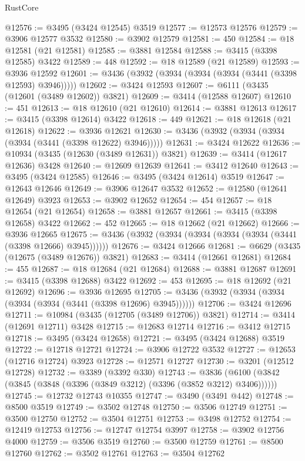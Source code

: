 \begin{lexlean}{RustCore}
\begin{coremodule}
@12576 := @3495 (@3424 @12545) @3519
@12577 := @12573 @12576
@12579 := @3906 @12577 @3532
@12580 := @3902 @12579
@12581 := 450
@12584 := @18 @12581 (@21 @12581)
@12585 := @3881 @12584
@12588 := @3415 (@3398 @12585) @3422
@12589 := 448
@12592 := @18 @12589 (@21 @12589)
@12593 := @3936 @12592
@12601 := @3436 (@3932 (@3934 (@3934 (@3934 (@3441 (@3398 @12593) @3946)))))
@12602 := @3424 @12593
@12607 := @6111 (@3435 (@12601 (@3489 @12602)) @3821)
@12609 := @3414 (@12588 @12607)
@12610 := 451
@12613 := @18 @12610 (@21 @12610)
@12614 := @3881 @12613
@12617 := @3415 (@3398 @12614) @3422
@12618 := 449
@12621 := @18 @12618 (@21 @12618)
@12622 := @3936 @12621
@12630 := @3436 (@3932 (@3934 (@3934 (@3934 (@3441 (@3398 @12622) @3946)))))
@12631 := @3424 @12622
@12636 := @10934 (@3435 (@12630 (@3489 @12631)) @3821)
@12639 := @3414 (@12617 @12636) @3428
@12640 := @12609 @12639
@12641 := @3412 @12640
@12643 := @3495 (@3424 @12585)
@12646 := @3495 (@3424 @12614) @3519
@12647 := @12643 @12646
@12649 := @3906 @12647 @3532
@12652 := @12580 (@12641 @12649) @3923
@12653 := @3902 @12652
@12654 := 454
@12657 := @18 @12654 (@21 @12654)
@12658 := @3881 @12657
@12661 := @3415 (@3398 @12658) @3422
@12662 := 452
@12665 := @18 @12662 (@21 @12662)
@12666 := @3936 @12665
@12675 := @3436 (@3932 (@3934 (@3934 (@3934 (@3934 (@3441 (@3398 @12666) @3945))))))
@12676 := @3424 @12666
@12681 := @6629 (@3435 (@12675 (@3489 @12676)) @3821)
@12683 := @3414 (@12661 @12681)
@12684 := 455
@12687 := @18 @12684 (@21 @12684)
@12688 := @3881 @12687
@12691 := @3415 (@3398 @12688) @3422
@12692 := 453
@12695 := @18 @12692 (@21 @12692)
@12696 := @3936 @12695
@12705 := @3436 (@3932 (@3934 (@3934 (@3934 (@3934 (@3441 (@3398 @12696) @3945))))))
@12706 := @3424 @12696
@12711 := @10984 (@3435 (@12705 (@3489 @12706)) @3821)
@12714 := @3414 (@12691 @12711) @3428
@12715 := @12683 @12714
@12716 := @3412 @12715
@12718 := @3495 (@3424 @12658)
@12721 := @3495 (@3424 @12688) @3519
@12722 := @12718 @12721
@12724 := @3906 @12722 @3532
@12727 := @12653 (@12716 @12724) @3923
@12728 := @12571 @12727
@12730 := @3201 (@12512 @12728)
@12732 := @3389 (@3392 @330)
@12743 := @3836 (@6100 (@3842 (@3845 (@3848 (@3396 (@3849 @3212) (@3396 (@3852 @3212) @3406))))))
@12745 := @12732 @12743 @10355
@12747 := @3490 (@3491 @442)
@12748 := @8500 @3519
@12749 := @3502 @12748
@12750 := @3506 @12749
@12751 := @3500 @12750
@12752 := @3504 @12751
@12753 := @3498 @12752
@12754 := @12419 @12753
@12756 := @12747 @12754 @3997
@12758 := @3902 @12756 @4000
@12759 := @3506 @3519
@12760 := @3500 @12759
@12761 := @8500 @12760
@12762 := @3502 @12761
@12763 := @3504 @12762

\end{coremodule}
\end{lexlean}
